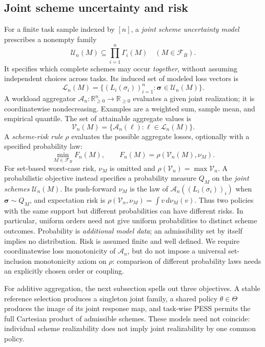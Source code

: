 \documentclass[sigconf, nonacm]{acmart}
\begin{document}
\subsection{Joint scheme uncertainty and risk}
\label{sec:joint-framework}
For a finite task sample indexed by $[n]$, a \emph{joint scheme
uncertainty model} prescribes a nonempty family
\begin{equation}
\label{eq:joint-family}
\mathcal U_n(M)\subseteq\prod_{i=1}^{n}\Gamma_i(M)
\quad (M\in\mathcal F_B).
\end{equation}
It specifies which complete schemes may occur \emph{together},
without assuming independent choices across tasks. Its induced
set of modeled loss vectors is
\[
\mathcal L_n(M)=\{(L_i(\sigma_i))_{i=1}^n:
  \boldsymbol\sigma\in\mathcal U_n(M)\}.
\]
A workload aggregator $\mathcal A_n:\mathbb R_{\geq0}^n
\to\mathbb R_{\geq0}$ evaluates a given joint realization;
it is coordinatewise nondecreasing. Examples are a weighted
sum, sample mean, and empirical quantile. The set of attainable
aggregate values is
\[
\mathcal V_n(M)=
\{\mathcal A_n(\boldsymbol\ell):
\boldsymbol\ell\in\mathcal L_n(M)\}.
\]
A \emph{scheme-risk rule} $\rho$ evaluates the possible
aggregate losses, optionally with a specified probability law:
\begin{equation}
\label{eq:unified-ess}
\min_{M\in\mathcal F_B} F_n(M),\qquad
F_n(M)=\rho(\mathcal V_n(M),\nu_M).
\end{equation}
For set-based worst-case risk, $\nu_M$ is omitted and
$\rho(\mathcal V_n)=\max\mathcal V_n$.
A probabilistic objective instead specifies a probability
measure $Q_M$ on the \emph{joint schemes}
$\mathcal U_n(M)$. Its push-forward $\nu_M$ is the law of
$\mathcal A_n((L_i(\sigma_i))_i)$ when
$\boldsymbol\sigma\sim Q_M$, and expectation risk is
$\rho(\mathcal V_n,\nu_M)=\int v\,d\nu_M(v)$.
Thus two policies with the same support but different
probabilities can have different risks. In particular,
uniform orders need not give uniform probabilities to
distinct scheme outcomes. Probability is \emph{additional
model data}; an admissibility set by itself implies no
distribution. Risk is assumed finite and well defined.
We require coordinatewise loss monotonicity of
$\mathcal A_n$, but do not impose a universal set-inclusion
monotonicity axiom on $\rho$: comparison of different
probability laws needs an explicitly chosen order or coupling.

For additive aggregation, the next subsection spells out
three objectives. A stable reference selection produces a
singleton joint family, a shared policy $\theta\in\Theta$
produces the image of its joint response map, and task-wise
PESS permits the full Cartesian product of admissible
schemes. These models need not coincide: individual
scheme realizability does not imply joint realizability
by one common policy.
\end{document}
